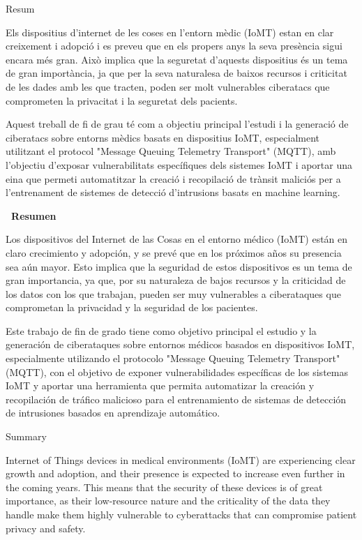 

\begin{center}
  \huge\bfseries\raggedright Resum~\hrulefill
\end{center}
Els dispositius d'internet de les coses en l'entorn mèdic (IoMT) estan en clar creixement i adopció i es preveu que en els propers anys la seva presència sigui encara més gran. Això implica que la seguretat d'aquests dispositius és un tema de gran importància, ja que per la seva naturalesa de baixos recursos i criticitat de les dades amb les que tracten, poden ser molt vulnerables ciberatacs que comprometen la privacitat i la seguretat dels pacients. 

Aquest treball de fi de grau té com a objectiu principal l'estudi i la generació de ciberatacs sobre entorns mèdics basats en dispositius IoMT, especialment utilitzant el protocol "Message Queuing Telemetry Transport" (MQTT), amb l'objectiu d'exposar vulnerabilitats específiques dels sistemes IoMT i aportar una eina que permeti automatitzar la creació i recopilació de trànsit maliciós per a l'entrenament de sistemes de detecció d'intrusions basats en machine learning.%
\begin{center}
  \huge\bfseries\raggedleft\vspace*{.5\baselineskip} \hrulefill ~Resumen
\end{center}
Los dispositivos del Internet de las Cosas en el entorno médico (IoMT) están en claro crecimiento y adopción, y se prevé que en los próximos años su presencia sea aún mayor. Esto implica que la seguridad de estos dispositivos es un tema de gran importancia, ya que, por su naturaleza de bajos recursos y la criticidad de los datos con los que trabajan, pueden ser muy vulnerables a ciberataques que comprometan la privacidad y la seguridad de los pacientes.

Este trabajo de fin de grado tiene como objetivo principal el estudio y la generación de ciberataques sobre entornos médicos basados en dispositivos IoMT, especialmente utilizando el protocolo "Message Queuing Telemetry Transport" (MQTT), con el objetivo de exponer vulnerabilidades específicas de los sistemas IoMT y aportar una herramienta que permita automatizar la creación y recopilación de tráfico malicioso para el entrenamiento de sistemas de detección de intrusiones basados en aprendizaje automático.
\begin{center}
  \huge\bfseries\raggedright\vspace*{.5\baselineskip} Summary~\hrulefill
\end{center}
Internet of Things devices in medical environments (IoMT) are experiencing clear growth and adoption, and their presence is expected to increase even further in the coming years. This means that the security of these devices is of great importance, as their low-resource nature and the criticality of the data they handle make them highly vulnerable to cyberattacks that can compromise patient privacy and safety.

